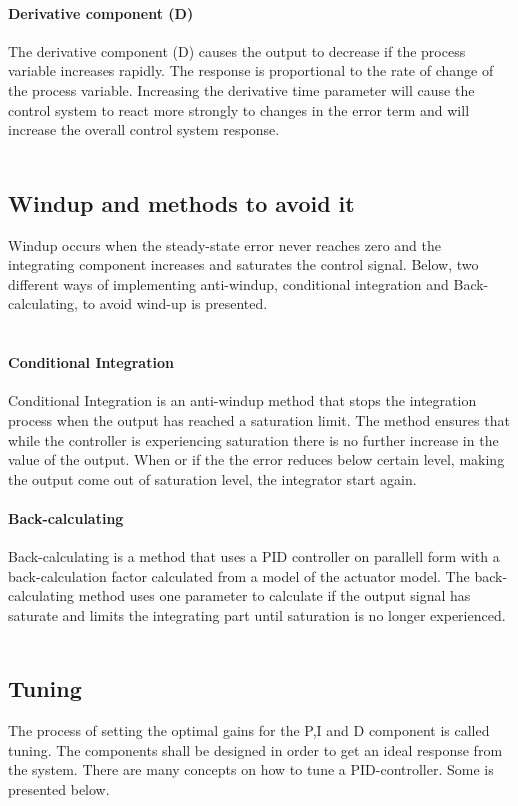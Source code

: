 \paragraph{Derivative component (D)}
The derivative component (D) causes the output to decrease if the process variable increases rapidly. The response is proportional to the rate of change of the process variable. Increasing the derivative time parameter will cause the control system to react more strongly to changes in the error term and will increase the overall control system response. \cite{PID}
\\
\\
\subsection{Windup and methods to avoid it}
Windup occurs when the steady-state error never reaches zero and the integrating component increases and saturates the control signal. Below, two different ways of implementing anti-windup, conditional integration and Back-calculating, to avoid wind-up is presented.\\
\\
\paragraph{Conditional Integration}
Conditional Integration is an anti-windup method that stops the integration process when the output has reached a saturation limit. The method ensures that while the controller is experiencing saturation there is no further increase in the value of the output. When or if the the error reduces below certain level, making the output come out of saturation level, the integrator start again. \cite{clamping}
\paragraph{Back-calculating}
Back-calculating is a method that uses a PID controller on parallell form with a back-calculation factor calculated from a model of the actuator model. The back-calculating method uses one parameter to calculate if the output signal has saturate and limits the integrating part until saturation is no longer experienced.\cite{clamping}\\
\\
\subsection{Tuning}
The process of setting the optimal gains for the P,I and D component is called tuning. The components shall be designed in order to get an ideal response from the system. There are many concepts on how to tune a PID-controller. Some is presented below.\\
\\
